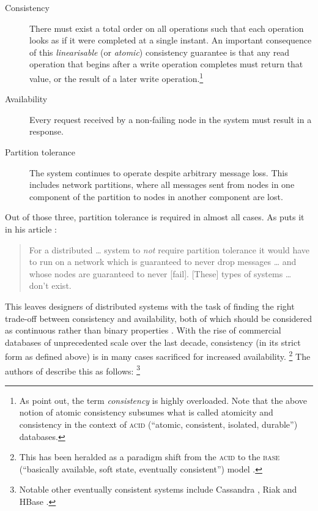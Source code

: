 \documentclass[draft,11pt,chapterprefix=true,toc=bibliography,numbers=noendperiod,
               footnotes=multiple,twoside]{scrreprt}
\begin{document}
\begin{description}
    \item[Consistency] There must exist a total order on all operations such that each operation looks as if it were completed at a single instant. An important consequence of this \emph{linearisable} (or \emph{atomic}) consistency guarantee is that any read operation that begins after a write operation completes must return that value, or the result of a later write operation.\footnote{As \textcite{capproof} point out, the term \emph{consistency} is highly overloaded. Note that the above notion of atomic consistency subsumes what is called atomicity and consistency in the context of \textsc{acid} (\enquote{atomic, consistent, isolated, durable}) databases.}
    \item[Availability] Every request received by a non-failing node in the system must result in a response.
    \item[Partition tolerance] The system continues to operate despite arbitrary message loss. This includes network partitions, where all messages sent from nodes in one component of the partition to nodes in another component are lost.
\end{description}

Out of those three, partition tolerance is required in almost all cases. As \citeauthor{needp} puts it in his article :

\begin{quote}
    For a distributed \dots{} system to \emph{not} require partition tolerance it would have to run on a network which is guaranteed to never drop messages \dots{} and whose nodes are guaranteed to never [fail]. [These] types of systems \dots{} don't exist.
\end{quote}

This leaves designers of distributed systems with the task of finding the right trade-off between consistency and availability, both of which should be considered as continuous rather than binary properties \autocite{cap12}. With the rise of commercial databases of unprecedented scale over the last decade, consistency (in its strict form as defined above) is in many cases sacrificed for increased availability.%
\footnote{This has been heralded as a paradigm shift from the \textsc{acid} to the \textsc{base} (\enquote{basically available, soft state, eventually consistent}) model \parencite{base}.} %
The authors of  describe this as follows:%
\footnote{Notable other eventually consistent systems include Cassandra , Riak  and HBase .}
\end{document}
